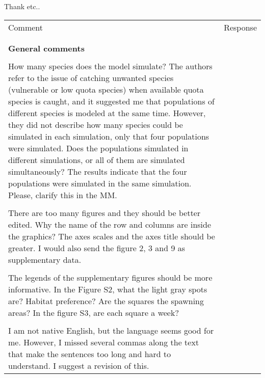 \documentclass{article}
\begin{document}
\begin{landscape}
Thank etc..


\begin{center}

\large

	\begin{longtable}{p{12cm} | p{12cm}}
		\toprule
		Comment & Response \\
		\\
		\hline
		\\
	\textbf{General comments} &  \\
\\
		 How many species does the model simulate? The authors refer to
		 the issue of catching unwanted species (vulnerable or low
		 quota species) when available quota species is caught, and it
		 suggested me that populations of different species is modeled
		 at the same time. However, they  did not describe how many
		 species could be simulated in each simulation, only that four
		 populations were simulated. Does the populations simulated in
		 different simulations, or all of them are simulated
		 simultaneously? The results indicate that the four populations
		 were simulated in the same simulation. Please, clarify this in
		 the MM.  &  \\
\\
There are too many figures and they should be better edited. Why the name of
the row and columns are inside the graphics? The axes scales and the axes title
should be greater. I would also send the figure 2, 3 and 9 as supplementary
data.  & \\
\\
The legends of the supplementary figures should be more informative. In the
Figure S2, what the light gray spots are? Habitat preference? Are the squares
the spawning areas? In the figure S3, are each square a week?  & \\
\\
I am not native English, but the language seems good for me. However, I missed
several commas along the text that make the sentences too long and hard to
understand. I suggest a revision of this.  & \\

		\hline


\end{longtable}
\end{center}
\end{landscape}
\end{document}
